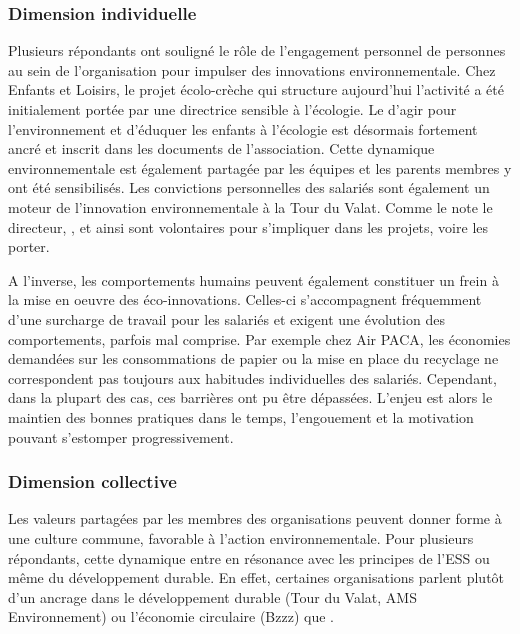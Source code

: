         \subsubsection{Dimension individuelle}
        Plusieurs répondants ont souligné le rôle de l'engagement personnel de personnes au sein de l'organisation pour impulser des innovations environnementale. Chez Enfants et Loisirs, le projet écolo-crèche qui structure aujourd'hui l'activité a été initialement portée par une directrice sensible à l'écologie. Le  d'agir pour l'environnement et d'éduquer les enfants à l'écologie est désormais fortement ancré et inscrit dans les documents de l'association. Cette dynamique environnementale est également partagée par les équipes et les parents membres y ont été sensibilisés. Les convictions personnelles des salariés sont également un moteur de l'innovation environnementale à la Tour du Valat. Comme le note le directeur, , et ainsi sont volontaires pour s'impliquer dans les projets, voire les porter.

        A l'inverse, les comportements humains peuvent également constituer un frein à la mise en oeuvre des éco-innovations. Celles-ci s'accompagnent fréquemment d'une surcharge de travail pour les salariés et exigent une évolution des comportements, parfois mal comprise. Par exemple chez Air PACA, les économies demandées sur les consommations de papier ou la mise en place du recyclage ne correspondent pas toujours aux habitudes individuelles des salariés. Cependant, dans la plupart des cas, ces barrières ont pu être dépassées. L'enjeu est alors le maintien des bonnes pratiques dans le temps, l'engouement et la motivation pouvant s'estomper progressivement.

        \subsubsection{Dimension collective}

        Les valeurs partagées par les membres des organisations peuvent donner forme à une culture commune, favorable à l'action environnementale. Pour plusieurs répondants, cette dynamique entre en résonance avec les principes de l'ESS ou même du développement durable. En effet, certaines organisations parlent plutôt d'un ancrage dans le développement durable (Tour du Valat, AMS Environnement) ou l'économie circulaire (Bzzz) que .

